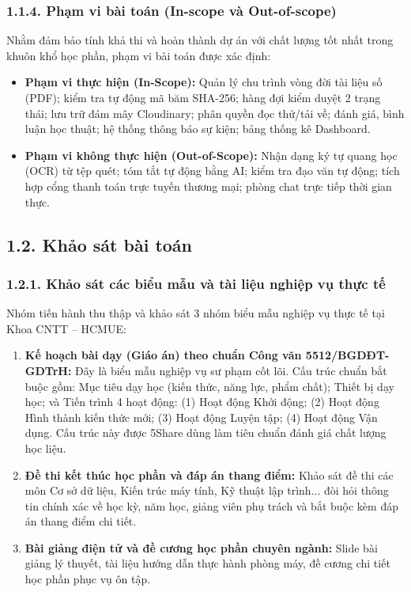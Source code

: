 \subsubsection{1.1.4. Phạm vi bài toán (In-scope và Out-of-scope)}
Nhằm đảm bảo tính khả thi và hoàn thành dự án với chất lượng tốt nhất trong khuôn khổ học phần, phạm vi bài toán được xác định:
\begin{itemize}
    \item \textbf{Phạm vi thực hiện (In-Scope):} Quản lý chu trình vòng đời tài liệu số (PDF); kiểm tra tự động mã băm SHA-256; hàng đợi kiểm duyệt 2 trạng thái; lưu trữ đám mây Cloudinary; phân quyền đọc thử/tải về; đánh giá, bình luận học thuật; hệ thống thông báo sự kiện; bảng thống kê Dashboard.
    \item \textbf{Phạm vi không thực hiện (Out-of-Scope):} Nhận dạng ký tự quang học (OCR) từ tệp quét; tóm tắt tự động bằng AI; kiểm tra đạo văn tự động; tích hợp cổng thanh toán trực tuyến thương mại; phòng chat trực tiếp thời gian thực.
\end{itemize}

\subsection{1.2. Khảo sát bài toán}

\subsubsection{1.2.1. Khảo sát các biểu mẫu và tài liệu nghiệp vụ thực tế}
Nhóm tiến hành thu thập và khảo sát 3 nhóm biểu mẫu nghiệp vụ thực tế tại Khoa CNTT -- HCMUE:
\begin{enumerate}
    \item \textbf{Kế hoạch bài dạy (Giáo án) theo chuẩn Công văn 5512/BGDĐT-GDTrH:} Đây là biểu mẫu nghiệp vụ sư phạm cốt lõi. Cấu trúc chuẩn bắt buộc gồm: Mục tiêu dạy học (kiến thức, năng lực, phẩm chất); Thiết bị dạy học; và Tiến trình 4 hoạt động: (1) Hoạt động Khởi động; (2) Hoạt động Hình thành kiến thức mới; (3) Hoạt động Luyện tập; (4) Hoạt động Vận dụng. Cấu trúc này được 5Share dùng làm tiêu chuẩn đánh giá chất lượng học liệu.
    \item \textbf{Đề thi kết thúc học phần và đáp án thang điểm:} Khảo sát đề thi các môn Cơ sở dữ liệu, Kiến trúc máy tính, Kỹ thuật lập trình... đòi hỏi thông tin chính xác về học kỳ, năm học, giảng viên phụ trách và bắt buộc kèm đáp án thang điểm chi tiết.
    \item \textbf{Bài giảng điện tử và đề cương học phần chuyên ngành:} Slide bài giảng lý thuyết, tài liệu hướng dẫn thực hành phòng máy, đề cương chi tiết học phần phục vụ ôn tập.
\end{enumerate}

